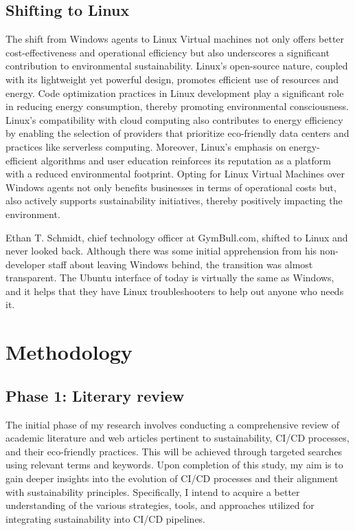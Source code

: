 \subsection{Shifting to Linux}

The shift from Windows agents to Linux Virtual machines not only offers better cost-effectiveness and operational efficiency but also underscores a significant contribution to environmental sustainability. \autocite{Germain2017} Linux's open-source nature, coupled with its lightweight yet powerful design, promotes efficient use of resources and energy. Code optimization practices in Linux development play a significant role in reducing energy consumption, thereby promoting environmental consciousness. Linux's compatibility with cloud computing also contributes to energy efficiency by enabling the selection of providers that prioritize eco-friendly data centers and practices like serverless computing. Moreover, Linux's emphasis on energy-efficient algorithms and user education reinforces its reputation as a platform with a reduced environmental footprint. Opting for Linux Virtual Machines over Windows agents not only benefits businesses in terms of operational costs but, also actively supports sustainability initiatives, thereby positively impacting the environment.

Ethan T. Schmidt, chief technology officer at GymBull.com, shifted to Linux and never looked back. Although there was some initial apprehension from his non-developer staff about leaving Windows behind, the transition was almost transparent. The Ubuntu interface of today is virtually the same as Windows, and it helps that they have Linux troubleshooters to help out anyone who needs it. \autocite{Germain2017}



\section{Methodology}%
\label{sec:methodologie}

\subsection{Phase 1: Literary review}
The initial phase of my research involves conducting a comprehensive review of academic literature and web articles pertinent to sustainability, CI/CD processes, and their eco-friendly practices. This will be achieved through targeted searches using relevant terms and keywords. Upon completion of this study, my aim is to gain deeper insights into the evolution of CI/CD processes and their alignment with sustainability principles. Specifically, I intend to acquire a better understanding of the various strategies, tools, and approaches utilized for integrating sustainability into CI/CD pipelines.


